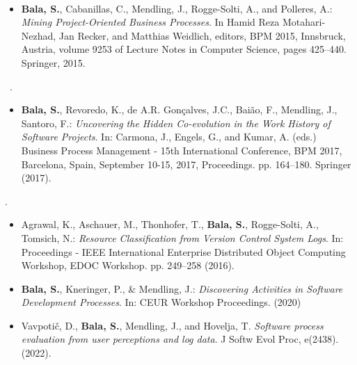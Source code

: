 ~\citep{DBLP:conf/bpm/BalaCMRP15}
\begin{itemize}
\item \textbf{Bala, S.}, Cabanillas, C., Mendling, J., Rogge-Solti, A., and Polleres, A.: \textit{Mining Project-Oriented Business Processes}. In Hamid Reza Motahari-Nezhad, Jan Recker, and Matthias Weidlich, editors, BPM 2015, Innsbruck, Austria, volume 9253 of Lecture Notes in Computer Science, pages 425--440. Springer, 2015. 
\end{itemize}	
~\citep{DBLP:conf/bpm/BalaRGBMS17}.
\begin{itemize}
	\item \textbf{Bala, S.}, Revoredo, K., de A.R. Gonçalves, J.C., Baião, F., Mendling, J., Santoro, F.: \textit{Uncovering the Hidden Co-evolution in the Work History of Software Projects}. In: Carmona, J., Engels, G., and Kumar, A. (eds.) Business Process Management - 15th International Conference, BPM 2017, Barcelona, Spain, September 10-15, 2017, Proceedings. pp. 164--180. Springer (2017). 
\end{itemize}
 \citep{DBLP:conf/edoc/AgrawalATBRT16}.
\begin{itemize}
	\item Agrawal, K., Aschauer, M., Thonhofer, T., \textbf{Bala, S.}, Rogge-Solti, A., Tomsich, N.: \textit{Resource Classification from Version Control System Logs}. In: Proceedings - IEEE International Enterprise Distributed Object Computing Workshop, EDOC Workshop. pp. 249--258 (2016). 
\end{itemize}
 \citep{DBLP:conf/ifip8-1/BalaKM20}
\begin{itemize}
	\item \textbf{Bala, S.}, Kneringer, P., \& Mendling, J.: \textit{Discovering Activities in Software Development Processes}. In: CEUR Workshop Proceedings. (2020)
\end{itemize}
 \citep{Vavpotic2022}
\begin{itemize}
	\item Vavpotič, D., \textbf{Bala, S.}, Mendling, J., and Hovelja, T.  \textit{Software process evaluation from user perceptions and log data}. J Softw Evol Proc, e(2438). (2022).
\end{itemize}


